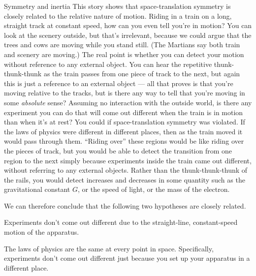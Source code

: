\label{sec:strong-inertia}
\begin{envsubsection}{Symmetry and inertia}
This story shows that space-translation symmetry is closely related to the relative nature
of motion. Riding in a train on a long, straight track at constant speed, how can you even
tell you're in motion? You can look at the scenery outside, but that's irrelevant, because
we could argue that the trees and cows are moving while you stand still. (The Martians
say both train and scenery are moving.) The real point is whether you can
detect your motion without reference to any external object. You can hear the repetitive
thunk-thunk-thunk as the train passes from one piece of track to the next, but again
this is just a reference to an external object --- all that proves is that you're moving
relative to the tracks, but is there any way to tell that you're moving in some
\emph{absolute} sense? Assuming no interaction with the outside world, 
is there any experiment you can do that will come out
different when the train is in motion than when it's at rest?
You could if space-translation symmetry was violated. If the laws of physics were different
in different places, then as the train moved it would pass through them. ``Riding over''
these regions would be like riding over the pieces of track, but you would be able
to detect the transition from one region to the next simply because experiments inside
the train came out different, without referring to any external objects.
Rather than the thunk-thunk-thunk of the rails, you would
detect increases and decreases in some quantity such as the gravitational constant $G$,
or the speed of light, or the mass of the electron.

We can therefore conclude that the following two hypotheses are closely related.

\begin{important}
Experiments don't come out different due to the straight-line,
constant-speed motion of the apparatus. 
\end{important}

\begin{important}
The laws of physics are the same at every point in space. Specifically, experiments
don't come out different just because you set up your apparatus in a different place.
\end{important}


\end{envsubsection}
